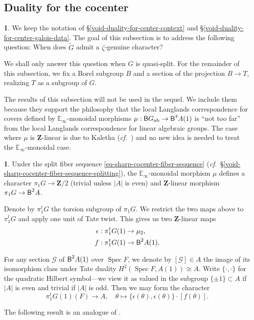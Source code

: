 \documentclass[10pt,english,reqno]{amsart}
\newcommand{\integers}{\mathbf Z}
\newcommand{\deloop}{\textnormal{\textsf{B}}}
\newcommand{\Spec}{\operatorname{Spec}}
\newcommand{\abelian}{\textnormal{ab}}
\theoremstyle{definition}
\numberwithin{equation}{section}
\newtheorem{untitledsubsubsection}[subsubsection]{}
\newenvironment{void}
{\begin{untitledsubsubsection}}
{\end{untitledsubsubsection}}
\begin{document}


\subsection{Duality for the cocenter}
\label{sec-duality-for-the-cocenter}

\begin{void}
We keep the notation of \S\ref{void-duality-for-center-context} and \S\ref{void-duality-for-center-galois-data}. The goal of this subsection is to address the following question: When does $\widetilde G$ admit a $\zeta$-genuine character?

We shall only answer this question when $G$ is quasi-split. For the remainder of this subsection, we fix a Borel subgroup $B$ and a section of the projection $B \rightarrow T$, realizing $T$ as a subgroup of $G$.

The results of this subsection will not be used in the sequel. We include them because they support the philosophy that the local Langlands correspondence for covers defined by $\mathbb E_{\infty}$-monoidal morphisms $\mu : \deloop G_{\abelian} \rightarrow \deloop^4A(1)$ is ``not too far'' from the local Langlands correspondence for linear algebraic groups. The case where $\mu$ is $\integers$-linear is due to Kaletha (\emph{cf.}~\cite[\S2]{kaletha2022}) and no new idea is needed to treat the $\mathbb E_{\infty}$-monoidal case.
\end{void}


\begin{void}
Under the split fiber sequence \eqref{eq-sharp-cocenter-fiber-sequence} (\emph{cf.}~\S\ref{void-sharp-cocenter-fiber-sequence-splitting}), the $\mathbb E_{\infty}$-monoidal morphism $\mu$ defines a character $\pi_1 G \rightarrow \integers/2$ (trivial unless $|A|$ is even) and $\integers$-linear morphism $\pi_1 G \rightarrow \deloop^2A$.

Denote by $\pi_1^t G$ the torsion subgroup of $\pi_1G$. We restrict the two maps above to $\pi_1^t G$ and apply one unit of Tate twist. This gives us two $\integers$-linear maps
\begin{align*}
	\epsilon : \pi_1^t G(1) &\rightarrow \mu_2,\\
	f : \pi_1^t G(1) &\rightarrow \deloop^2A(1).
\end{align*}

For any section $\mathscr G$ of $\deloop^2A(1)$ over $\Spec F$, we denote by $[\mathscr G] \in A$ the image of its isomorphism class under Tate duality $H^2(\Spec F, A(1)) \cong A$. Write $\{\cdot, \cdot\}$ for the quadratic Hilbert symbol---we view it as valued in the subgroup $\{\pm 1\} \subset A$ if $|A|$ is even and trivial if $|A|$ is odd. Then we may form the character
\begin{equation}
\label{eq-sharp-cover-genuine-character-obstruction}
\pi_1^t G(1)(F) \rightarrow A, \quad \theta \mapsto \{\epsilon(\theta), \epsilon(\theta)\} \cdot [f(\theta)].
\end{equation}

The following result is an analogue of \cite[Proposition 2.4.7]{kaletha2022}.
\end{void}
\end{document}
